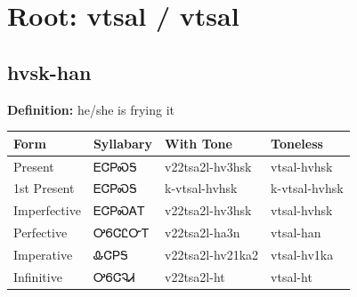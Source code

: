 \documentclass{article}%
\begin{document}
%
\normalsize%
\section*{Root: vtsal / vtsal}%
\subsection*{hvsk-han}%
\textbf{Definition: }%
he/she is frying it%
\\[0.5em]%
\begin{tabular}{|l|l|l|l|}%
\hline%
\textbf{Form}&\textbf{Syllabary}&\textbf{With Tone}&\textbf{Toneless}\\%
\hline%
Present&ᎬᏣᏢᏍᎦ&v22tsa2l{-}hv3hsk&vtsal{-}hvhsk\\%
1st Present&ᎬᏣᏢᏍᎦ&k{-}vtsal{-}hvhsk&k{-}vtsal{-}hvhsk\\%
Imperfective&ᎬᏣᏢᏍᎪᎢ&v22tsa2l{-}hv3hsk&vtsal{-}hvhsk\\%
Perfective&ᎤᏮᏣᏝᏅᎢ&v22tsa2l{-}ha3n&vtsal{-}han\\%
Imperative&ᎲᏣᏢᎦ&v22tsa2l{-}hv21ka2&vtsal{-}hv1ka\\%
Infinitive&ᎤᏮᏣᎸᏗ&v22tsa2l{-}ht&vtsal{-}ht\\%
\hline%
\end{tabular}%
\\[1em]%
\end{document}
